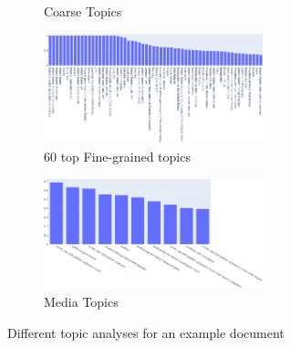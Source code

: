 \begin{figure}
\begin{subfigure}{0.45\textwidth}
		\caption{Coarse Topics} %
            \label{fig:topic_analysis_different_tools_coarse} 
	\end{subfigure}
	\begin{subfigure}{\textwidth} %
		\centering\includegraphics[width=0.7\textwidth]{figures/finegrained_topics.pdf}
		\caption{60 top Fine-grained topics} %
            \label{fig:topic_analysis_different_tools_fine} 
	\end{subfigure}
	\begin{subfigure}{\textwidth} %
		\centering\includegraphics[width=0.7\textwidth]{figures/mediatopics.pdf}
		\caption{Media Topics} %
            \label{fig:topic_analysis_different_tools_mediatopics} 
	\end{subfigure}
    \caption{Different topic analyses for an example document}
    \label{fig:topic_analysis_different_tools} 
\end{figure}

